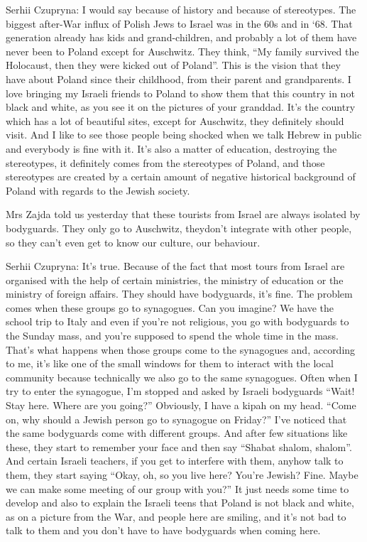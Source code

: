 Serhii Czupryna: I would say because of history and because of stereotypes. The biggest after-War influx of Polish Jews to Israel was in the 60s and in ‘68. That generation already has kids and grand-children, and probably a lot of them have never been to Poland except for Auschwitz. They think, “My family survived the Holocaust, then they were kicked out of Poland”. This is the vision that they have about Poland since their childhood, from their parent and grandparents. I love bringing my Israeli friends to Poland to show them that this country in not black and white, as you see it on the pictures of your granddad. It’s the country which has a lot of beautiful sites, except for Auschwitz, they definitely should visit. And I like to see those people being shocked when we talk Hebrew in public and everybody is fine with it. It’s also a matter of education, destroying the stereotypes, it definitely comes from the stereotypes of Poland, and those stereotypes are created by a certain amount of negative historical background of Poland with regards to the Jewish society.  

Mrs Zajda told us yesterday that these tourists from Israel are always isolated by bodyguards. They only go to Auschwitz,  theydon’t integrate with other people, so they can’t even get to know our culture, our behaviour. 

Serhii Czupryna: It’s true. Because of the fact that most tours from Israel are organised with the help of certain ministries, the ministry of education or the ministry of foreign affairs. They should have bodyguards, it’s fine. The problem comes when these groups go to synagogues. Can you imagine? We have the school trip to Italy and even if you’re not religious, you go with bodyguards to the Sunday mass, and you’re supposed to spend the whole time in the mass. That’s what happens when those groups come to the synagogues and, according to me, it’s like one of the small windows for them to interact with the local community because technically we also go to the same synagogues. Often when I try to enter the synagogue, I’m stopped and asked by Israeli bodyguards “Wait! Stay here. Where are you going?” Obviously, I have a kipah on my head. “Come on, why should a Jewish person go to synagogue on Friday?” I’ve noticed that the same bodyguards come with different groups. And after few situations like these, they start to remember your face and then say “Shabat shalom, shalom”. And certain Israeli teachers, if you get to interfere with them, anyhow talk to them, they start saying “Okay, oh, so you live here? You’re Jewish? Fine. Maybe we can make some meeting of our group with you?” It just needs some time to develop and also to explain the Israeli teens that Poland is not black and white, as on a picture from the War, and people here are smiling, and it’s not bad to talk to them and you don’t have to have bodyguards when coming here.  

